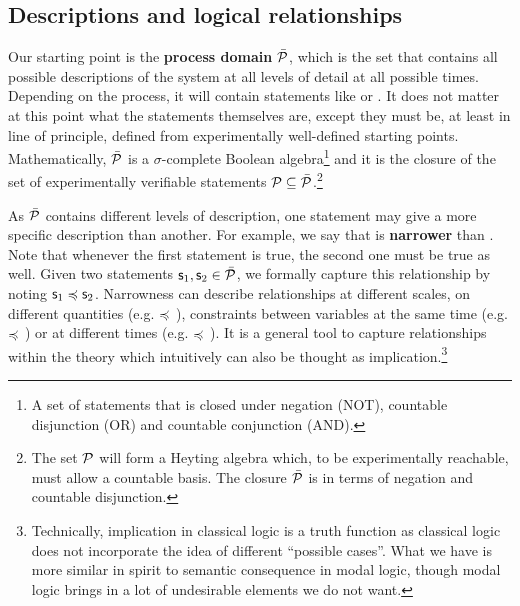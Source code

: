 \documentclass[letterpaper]{article}
\begin{document}
\subsection{Descriptions and logical relationships}

Our starting point is the \textbf{process domain} $\tdomain[P]$, which is the set that contains all possible descriptions of the system at all levels of detail at all possible times. Depending on the process, it will contain statements like  or . It does not matter at this point what the statements themselves are, except they must be, at least in line of principle, defined from experimentally well-defined starting points. Mathematically, $\tdomain[P]$ is a $\sigma$-complete Boolean algebra\footnote{A set of statements that is closed under negation (NOT), countable disjunction (OR) and countable conjunction (AND).} and it is the closure of the set of experimentally verifiable statements $\edomain[P] \subseteq \tdomain[P]$.\footnote{The set $\edomain[P]$ will form a Heyting algebra which, to be experimentally reachable, must allow a countable basis. The closure $\tdomain[P]$ is in terms of negation and countable disjunction.}

As $\tdomain[P]$ contains different levels of description, one statement may give a more specific description than another. For example, we say that  is \textbf{narrower} than . Note that whenever the first statement is true, the second one must be true as well. Given two statements $\stmt_1, \stmt_2 \in \tdomain[P]$, we formally capture this relationship by noting $\stmt_1 \narrower \stmt_2$. Narrowness can describe relationships at different scales, on different quantities (e.g.  $\narrower$ ), constraints between variables at the same time (e.g.  $\narrower$ ) or at different times (e.g.  $\narrower$ ). It is a general tool to capture relationships within the theory which intuitively can also be thought as implication.\footnote{Technically, implication in classical logic is a truth function as classical logic does not incorporate the idea of different ``possible cases''. What we have is more similar in spirit to semantic consequence in modal logic, though modal logic brings in a lot of undesirable elements we do not want.}
\end{document}
